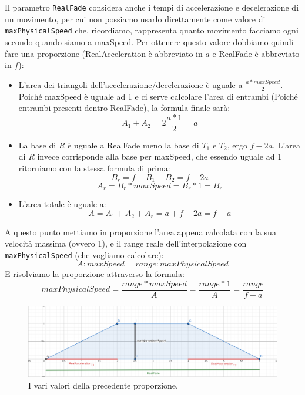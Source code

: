\documentclass[main.tex]{subfiles}
\begin{document}
Il parametro \lstinline{RealFade} considera anche i tempi di accelerazione e decelerazione di un movimento, per cui non possiamo usarlo direttamente come valore di \lstinline{maxPhysicalSpeed} che, ricordiamo, rappresenta quanto movimento facciamo ogni secondo quando siamo a maxSpeed. Per ottenere questo valore dobbiamo quindi fare una proporzione (RealAcceleration è abbreviato in $a$ e RealFade è abbreviato in $f$):
\begin{itemize}
    \item L'area dei triangoli dell'accelerazione/decelerazione è uguale a $\frac{a * maxSpeed}{2}$. Poiché maxSpeed è uguale ad 1 e ci serve calcolare l'area di entrambi (Poiché entrambi presenti dentro RealFade), la formula finale sarà:
    \[A_1 + A_2 = 2\frac{a * 1}{2} = a\]
    \item La base di $R$ è uguale a RealFade meno la base di $T_1$ e $T_2$, ergo $f - 2a$. L'area di $R$ invece corrisponde alla base per maxSpeed, che essendo uguale ad 1 ritorniamo con la stessa formula di prima:
    \[B_r = f - B_1 - B_2 = f - 2a\]
    \[A_r = B_r * maxSpeed = B_r * 1 = B_r\]
    \item L'area totale è uguale a:
    \[A = A_1 + A_2 + A_r = a + f - 2a = f - a\]
\end{itemize}
A questo punto mettiamo in proporzione l'area  appena calcolata con la sua velocità massima (ovvero 1), e il range reale dell'interpolazione con \lstinline{maxPhysicalSpeed} (che vogliamo calcolare):
\[A : maxSpeed = range : maxPhysicalSpeed\]
E risolviamo la proporzione attraverso la formula:
\[maxPhysicalSpeed = \frac{range * maxSpeed}{A} = \frac{range * 1}{A} = \frac{range}{f - a}\]
\begin{figure}[H]
    \centering
    \includegraphics[width=1\linewidth]{img/interpolazione/RealAccelerationVSRealFadeVSmaxSpeed.png}
    \caption{I vari valori della precedente proporzione.}
    \label{fig:4_RealAccelerationVSRealFadeVSmaxSpeed}
\end{figure}
\clearpage %
\end{document}
